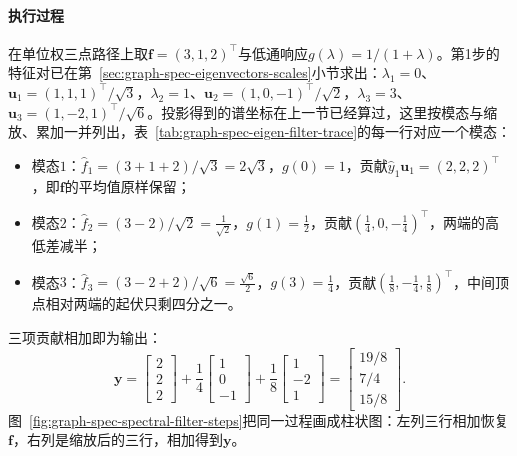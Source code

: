 \paragraph{执行过程}
在单位权三点路径上取$\bm f=(3,1,2)^{\top}$与低通响应$g(\lambda)=1/(1+\lambda)$。第1步的特征对已在第~\ref{sec:graph-spec-eigenvectors-scales}小节求出：$\lambda_1=0$、$\bm u_1=(1,1,1)^{\top}/\sqrt3$，$\lambda_2=1$、$\bm u_2=(1,0,-1)^{\top}/\sqrt2$，$\lambda_3=3$、$\bm u_3=(1,-2,1)^{\top}/\sqrt6$。投影得到的谱坐标在上一节已经算过，这里按模态与缩放、累加一并列出，表~\ref{tab:graph-spec-eigen-filter-trace}的每一行对应一个模态：
\begin{itemize}
  \item 模态$1$：$\widehat f_1=(3+1+2)/\sqrt3=2\sqrt3$，$g(0)=1$，贡献$\widehat y_1\bm u_1=(2,2,2)^{\top}$，即$\bm f$的平均值原样保留；
  \item 模态$2$：$\widehat f_2=(3-2)/\sqrt2=\tfrac1{\sqrt2}$，$g(1)=\tfrac12$，贡献$(\tfrac14,0,-\tfrac14)^{\top}$，两端的高低差减半；
  \item 模态$3$：$\widehat f_3=(3-2+2)/\sqrt6=\tfrac{\sqrt6}2$，$g(3)=\tfrac14$，贡献$(\tfrac18,-\tfrac14,\tfrac18)^{\top}$，中间顶点相对两端的起伏只剩四分之一。
\end{itemize}
三项贡献相加即为输出：
\[
 \bm y=\begin{bmatrix}2\\2\\2\end{bmatrix}+\frac14\begin{bmatrix}1\\0\\-1\end{bmatrix}+\frac18\begin{bmatrix}1\\-2\\1\end{bmatrix}
 =\begin{bmatrix}19/8\\7/4\\15/8\end{bmatrix}.
\]
图~\ref{fig:graph-spec-spectral-filter-steps}把同一过程画成柱状图：左列三行相加恢复$\bm f$，右列是缩放后的三行，相加得到$\bm y$。

